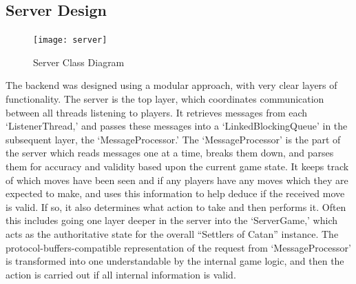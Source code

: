 \documentclass[a4paper,doc,draftfirst]{apa6}
\begin{document}
\subsection{Server Design}
\begin{figure}[hbtp]
      \texttt{[image: server]}
      \caption{Server Class Diagram}
\end{figure}
The backend was designed using a modular approach, with very clear layers of functionality. The server is the top layer, which coordinates communication between all threads listening to players. It retrieves messages from each ‘ListenerThread,’ and passes these messages into a ‘LinkedBlockingQueue’ in the subsequent layer, the ‘MessageProcessor.’ The ‘MessageProcessor’ is the part of the server which reads messages one at a time, breaks them down, and parses them for accuracy and validity based upon the current game state. It keeps track of which moves have been seen and if any players have any moves which they are expected to make, and uses this information to help deduce if the received move is valid. If so, it also determines what action to take and then performs it. Often this includes going one layer deeper in the server into the ‘ServerGame,’ which acts as the authoritative state for the overall “Settlers of Catan” instance. The protocol-buffers-compatible representation of the request from ‘MessageProcessor’ is transformed into one understandable by the internal game logic, and then the action is carried out if all internal information is valid.
\end{document}

